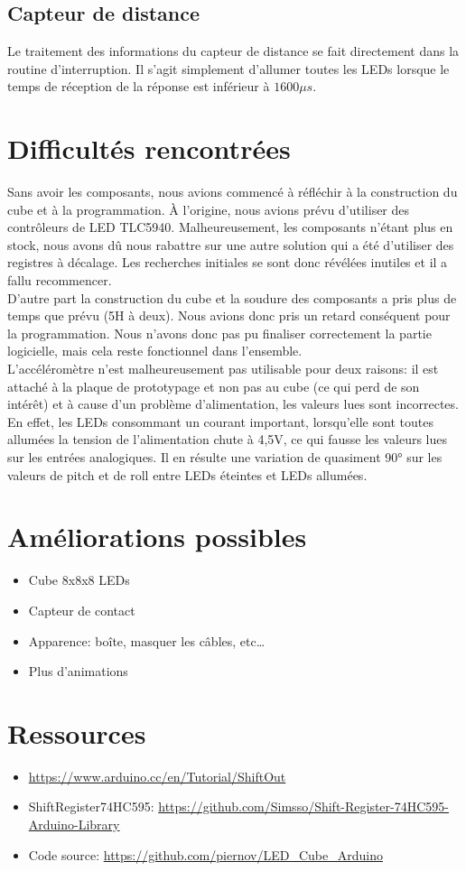 \documentclass{article}
\begin{document}
\subsection{Capteur de distance}
Le traitement des informations du capteur de distance se fait directement dans la routine d'interruption. Il s'agit simplement d'allumer toutes les LEDs lorsque le temps de réception de la réponse est inférieur à $1600\mu s$.

\section{Difficultés rencontrées}

Sans avoir les composants, nous avions commencé à réfléchir à la construction du cube et à la programmation. À l'origine, nous avions prévu d'utiliser des contrôleurs de LED TLC5940. Malheureusement, les composants n'étant plus en stock, nous avons dû nous rabattre sur une autre solution qui a été d'utiliser des registres à décalage. Les recherches initiales se sont donc révélées inutiles et il a fallu recommencer.\\
D'autre part la construction du cube et la soudure des composants a pris plus de temps que prévu (5H à deux). Nous avions donc pris un retard conséquent pour la programmation. Nous n'avons donc pas pu finaliser correctement la partie logicielle, mais cela reste fonctionnel dans l'ensemble.\\

L'accéléromètre n'est malheureusement pas utilisable pour deux raisons: il est attaché à la plaque de prototypage et non pas au cube (ce qui perd de son intérêt) et à cause d'un problème d'alimentation, les valeurs lues sont incorrectes.\\
En effet, les LEDs consommant un courant important, lorsqu'elle sont toutes allumées la tension de l'alimentation chute à 4,5V, ce qui fausse les valeurs lues sur les entrées analogiques. Il en résulte une variation de quasiment 90° sur les valeurs de pitch et de roll entre LEDs éteintes et LEDs allumées.


\section{Améliorations possibles}
  \begin{itemize}
    \item Cube 8x8x8 LEDs
    \item Capteur de contact
    \item Apparence: boîte, masquer les câbles, etc…
    \item Plus d'animations
  \end{itemize}

\section{Ressources}

  \begin{itemize}
    \item \url{https://www.arduino.cc/en/Tutorial/ShiftOut}
    \item ShiftRegister74HC595: \url{https://github.com/Simsso/Shift-Register-74HC595-Arduino-Library}
    \item Code source: \url{https://github.com/piernov/LED_Cube_Arduino}
  \end{itemize}
\end{document}
